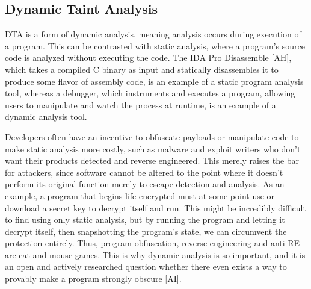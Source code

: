 \documentclass[11pt,expanded,copyright]{fsuthesis}
\begin{document}
\subsection{Dynamic Taint Analysis}

DTA is a form of dynamic analysis, meaning analysis occurs during execution of a program. This can be contrasted with static analysis, where a program's source code is analyzed without executing the code. The IDA Pro Disassemble [AH], which takes a compiled C binary as input and statically disassembles it to produce some flavor of assembly code, is an example of a static program analysis tool, whereas a debugger, which instruments and executes a program, allowing users to manipulate and watch the process at runtime, is an example of a dynamic analysis tool.

Developers often have an incentive to obfuscate payloads or manipulate code to make static analysis more costly, such as malware and exploit writers who don't want their products detected and reverse engineered. This merely raises the bar for attackers, since software cannot be altered to the point where it doesn't perform its original function merely to escape detection and analysis. As an example, a program that begins life encrypted must at some point use or download a secret key to decrypt itself and run. This might be incredibly difficult to find using only static analysis, but by running the program and letting it decrypt itself, then snapshotting the program's state, we can circumvent the protection entirely. Thus, program obfuscation, reverse engineering and anti-RE are cat-and-mouse games.  This is why dynamic analysis is so important, and it is an open and actively researched question whether there even exists a way to provably make a program strongly obscure [AI].
\end{document}
